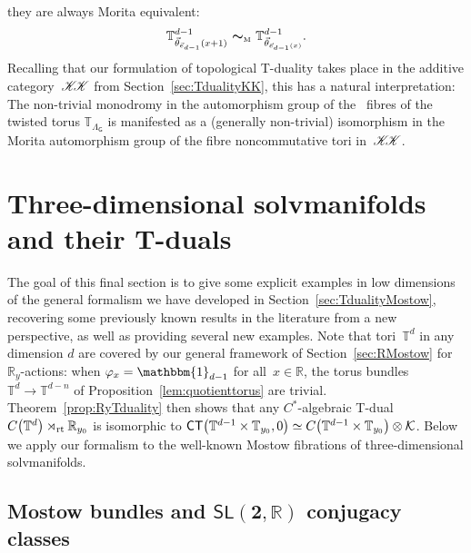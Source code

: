 \documentclass[10pt,a4paper]{amsart}
\numberwithin{equation}{section}
\newcommand{\C}{\complex}
\newcommand{\mbf}[1]{{\boldsymbol {#1} }}
\def\T{{\sf T}}
\def\C{{\sf C}}
\newcommand{\unit}{\mathbbm{1}} 			%
\newcommand{\CCK}{\mathscr{K}}
\newcommand{\CK}{\mathcal{K}}
\newcommand{\sfG}{\mathsf{G}}
\newcommand{\sfSL}{\mathsf{SL}}
\newcommand{\rt}{{\rm rt}}
\newcommand{\R}{\real}
\newcommand{\complex}{{\mathbb C}} %
\newcommand{\real}{{\mathbb R}} %
\newcommand{\torus}{{\mathbb T}} %
\begin{document}
\begin{Remark}
they are always Morita
equivalent:
\[
\torus^{d-1}_{\vec\theta_{\vec e_{d-1}}(x+1)} \ \mbf\sim_{\text{\tiny
 M}} \ \torus^{d-1}_{\vec\theta_{\vec e_{d-1}(x)}} .
\]
Recalling that our formulation of topological T-duality takes place in the additive category~${\CCK\hspace{-1mm}\CCK}$ from
Section~\ref{sec:TdualityKK}, this has a natural interpretation: The
non-trivial monodromy in the automorphism group of the~\smash{$\torus^{d-1}$} fibres of the
twisted torus $\torus_{\Lambda_\sfG}$ is
manifested as a (generally non-trivial) isomorphism in the Morita automorphism
group of the fibre noncommutative tori in~${\CCK\hspace{-1mm}\CCK}$.
\end{Remark}

\section{Three-dimensional solvmanifolds and their T-duals}\label{sec:3dexamples}

The goal of this final section is to give some explicit examples in
low dimensions of the general formalism we have developed in
Section~\ref{sec:TdualityMostow}, recovering some previously known
results in the literature from a new perspective, as well as providing several new examples.
Note that tori~$\torus^d$ in any
dimension $d$ are covered by our general framework of
Section~\ref{sec:RMostow} for~$\R_y$-actions: when
\mbox{$\varphi_x=\unit_{d-1}$} for all~$x\in\R$, the torus bundles
$\torus^d\to\torus^{d-n}$ of Proposition~\ref{lem:quotienttorus} are
\mbox{trivial}. Theorem~\ref{prop:RyTduality} then shows that any
$C^*$-algebraic T-dual $C\big(\torus^d\big)\rtimes_\rt\R_{y_0}$ is isomorphic
to $\C\T\big(\torus^{d-1}\times\torus_{y_0},0\big)\simeq
C\big(\torus^{d-1}\times\torus_{y_0}\big)\otimes\CK$. Below we
apply our formalism to the well-known Mostow fibrations of
three-dimensional solvmanifolds.

\subsection[Mostow bundles and $\sfSL(2,\R)$ conjugacy classes]{Mostow bundles and $\boldsymbol{\sfSL(2,\R)}$ conjugacy classes}
\end{document}
